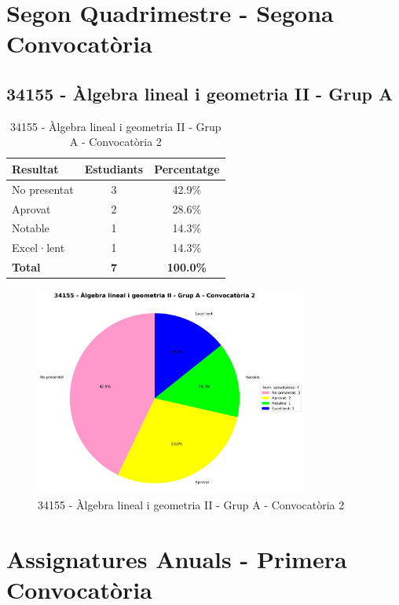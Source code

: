 \documentclass[12pt,a4paper]{article}
\begin{document}
\newpage


\section{Segon Quadrimestre - Segona Convocatòria}


\subsection{34155 - Àlgebra lineal i geometria II - Grup A}


\begin{table}[H]
\centering
\caption{34155 - Àlgebra lineal i geometria II - Grup A - Convocatòria 2}
\begin{tabular}{|l|c|c|}
\hline
\textbf{Resultat} & \textbf{Estudiants} & \textbf{Percentatge} \\
\hline
No presentat & 3 & 42.9\% \\
Aprovat & 2 & 28.6\% \\
Notable & 1 & 14.3\% \\
Excel·lent & 1 & 14.3\% \\
\hline
\textbf{Total} & \textbf{7} & \textbf{100.0\%} \\
\hline
\end{tabular}
\end{table}

\begin{figure}[H]
\centering
\includegraphics[width=0.8\textwidth]{graficos/34155_A_2Q2.png}
\caption{34155 - Àlgebra lineal i geometria II - Grup A - Convocatòria 2}
\end{figure}

\newpage


\section{Assignatures Anuals - Primera Convocatòria}
\end{document}
